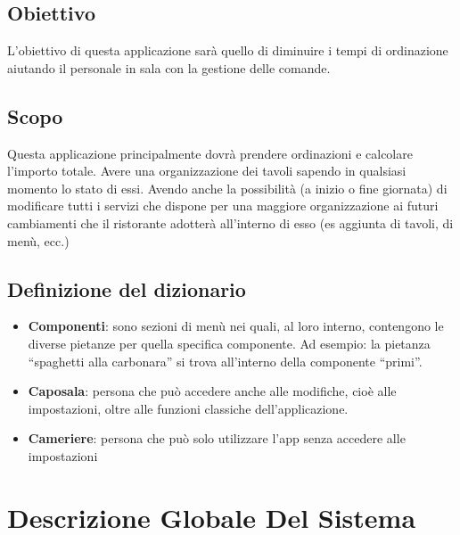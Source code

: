\documentclass[12pt, letterpaper]{book}
\begin{document}
\subsection{Obiettivo}
L'obiettivo di questa applicazione sarà quello di diminuire i tempi di ordinazione aiutando  il personale in sala con la gestione delle comande.
\subsection{Scopo}
Questa applicazione principalmente dovrà prendere ordinazioni e calcolare l'importo totale. Avere una organizzazione dei tavoli sapendo in qualsiasi momento lo stato di essi. Avendo anche la possibilità (a inizio o fine giornata) di modificare tutti i servizi che dispone per una maggiore organizzazione ai futuri cambiamenti che il ristorante adotterà all'interno di esso (es aggiunta di tavoli, di menù, ecc.)
\subsection{Definizione del dizionario}
\begin{itemize}
    \item \textbf{Componenti}: sono sezioni di menù nei quali, al loro interno, contengono le diverse pietanze per quella specifica componente. Ad esempio: la pietanza “spaghetti alla carbonara” si trova all'interno della componente “primi”.
    \item \textbf{Caposala}: persona che può accedere anche alle modifiche, cioè alle impostazioni, oltre alle funzioni classiche dell'applicazione.
    \item \textbf{Cameriere}: persona che può solo utilizzare l'app senza accedere alle impostazioni
\end{itemize}
\section{Descrizione Globale Del Sistema}
\end{document}
